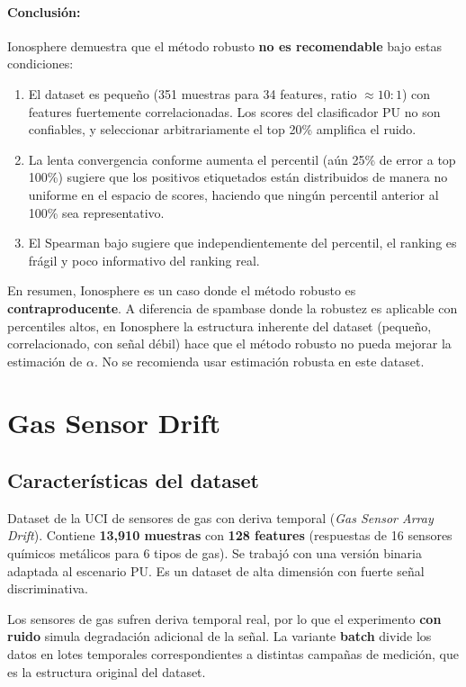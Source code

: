 \documentclass[a4paper,11pt]{article}
\begin{document}
\paragraph{Conclusión:} Ionosphere demuestra que el método robusto \textbf{no es recomendable} bajo estas condiciones:

\begin{enumerate}
    \item El dataset es pequeño (351 muestras para 34 features, ratio $\approx 10:1$) con features fuertemente correlacionadas. Los scores del clasificador PU no son confiables, y seleccionar arbitrariamente el top 20\% amplifica el ruido.
    \item La lenta convergencia conforme aumenta el percentil (aún 25\% de error a top 100\%) sugiere que los positivos etiquetados están distribuidos de manera no uniforme en el espacio de scores, haciendo que ningún percentil anterior al 100\% sea representativo.
    \item El Spearman bajo sugiere que independientemente del percentil, el ranking es frágil y poco informativo del ranking real.
\end{enumerate}

En resumen, Ionosphere es un caso donde el método robusto es \textbf{contraproducente}. A diferencia de spambase donde la robustez es aplicable con percentiles altos, en Ionosphere la estructura inherente del dataset (pequeño, correlacionado, con señal débil) hace que el método robusto no pueda mejorar la estimación de $\alpha$. No se recomienda usar estimación robusta en este dataset.

\section{Gas Sensor Drift}

\subsection{Características del dataset}

Dataset de la UCI de sensores de gas con deriva temporal (\textit{Gas Sensor Array Drift}). Contiene \textbf{13{,}910 muestras} con \textbf{128 features} (respuestas de 16 sensores químicos metálicos para 6 tipos de gas). Se trabajó con una versión binaria adaptada al escenario PU. Es un dataset de alta dimensión con fuerte señal discriminativa.

Los sensores de gas sufren deriva temporal real, por lo que el experimento \textbf{con ruido} simula degradación adicional de la señal. La variante \textbf{batch} divide los datos en lotes temporales correspondientes a distintas campañas de medición, que es la estructura original del dataset.
\end{document}
